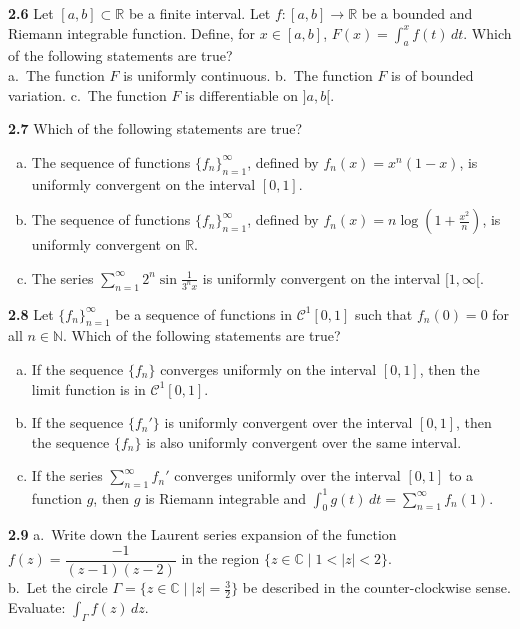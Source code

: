 \documentclass[11pt,a4paper]{article}
\newcommand{\N}{\mathbb{N}}
\newcommand{\R}{\mathbb{R}}
\newcommand{\C}{\mathbb{C}}
\newcommand{\qitem}[1]{\par\medskip\noindent\textbf{#1}\hspace{0.5em}}
\begin{document}
\qitem{2.6} Let $[a, b] \subset \R$ be a finite interval. Let $f : [a, b] \to \R$ be a bounded and Riemann integrable function. Define, for $x \in [a, b]$, $F(x) = \int_a^x f(t)\,dt$. Which of the following statements are true?\\
a.\ The function $F$ is uniformly continuous. \qquad b.\ The function $F$ is of bounded variation. \qquad c.\ The function $F$ is differentiable on $]a, b[$.

\qitem{2.7} Which of the following statements are true?
\begin{enumerate}[a.]
  \item The sequence of functions $\{f_n\}_{n=1}^{\infty}$, defined by $f_n(x) = x^n(1 - x)$, is uniformly convergent on the interval $[0, 1]$.
  \item The sequence of functions $\{f_n\}_{n=1}^{\infty}$, defined by $f_n(x) = n\log\left(1 + \frac{x^2}{n}\right)$, is uniformly convergent on $\R$.
  \item The series $\displaystyle\sum_{n=1}^{\infty} 2^n \sin\frac{1}{3^n x}$ is uniformly convergent on the interval $[1, \infty[$.
\end{enumerate}

\qitem{2.8} Let $\{f_n\}_{n=1}^{\infty}$ be a sequence of functions in $\mathcal{C}^1[0, 1]$ such that $f_n(0) = 0$ for all $n \in \N$. Which of the following statements are true?
\begin{enumerate}[a.]
  \item If the sequence $\{f_n\}$ converges uniformly on the interval $[0, 1]$, then the limit function is in $\mathcal{C}^1[0, 1]$.
  \item If the sequence $\{f_n'\}$ is uniformly convergent over the interval $[0, 1]$, then the sequence $\{f_n\}$ is also uniformly convergent over the same interval.
  \item If the series $\sum_{n=1}^{\infty} f_n'$ converges uniformly over the interval $[0, 1]$ to a function $g$, then $g$ is Riemann integrable and $\int_0^1 g(t)\,dt = \sum_{n=1}^{\infty} f_n(1)$.
\end{enumerate}

\qitem{2.9} a.\ Write down the Laurent series expansion of the function $f(z) = \dfrac{-1}{(z - 1)(z - 2)}$ in the region $\{z \in \C \mid 1 < |z| < 2\}$.\\
b.\ Let the circle $\Gamma = \{z \in \C \mid |z| = \frac{3}{2}\}$ be described in the counter-clockwise sense. Evaluate: $\int_\Gamma f(z)\,dz$.
\end{document}
